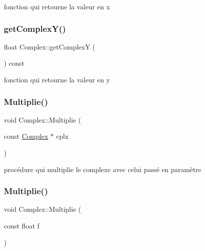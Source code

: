 fonction qui retourne la valeur en x 

\mbox{\label{classComplex_ae94fc4f9008123778a6a6a012ca5059b}} 
\subsubsection{\texorpdfstring{get\+Complex\+Y()}{getComplexY()}}
{\footnotesize\ttfamily float Complex\+::get\+ComplexY (\begin{DoxyParamCaption}{ }\end{DoxyParamCaption}) const}



fonction qui retourne la valeur en y 

\mbox{\label{classComplex_ae2d874e5fd18af604d6b1429b2b252b1}} 
\subsubsection{\texorpdfstring{Multiplie()}{Multiplie()}\hspace{0.1cm}{\footnotesize\ttfamily [1/2]}}
{\footnotesize\ttfamily void Complex\+::\+Multiplie (\begin{DoxyParamCaption}\item[{const \hyperlink{classComplex}{Complex} $\ast$}]{cplx }\end{DoxyParamCaption})}



procédure qui multiplie le complexe avec celui passé en paramètre 

\mbox{\label{classComplex_ac1cf09bfb20040d2b7bd135e40f51929}} 
\subsubsection{\texorpdfstring{Multiplie()}{Multiplie()}\hspace{0.1cm}{\footnotesize\ttfamily [2/2]}}
{\footnotesize\ttfamily void Complex\+::\+Multiplie (\begin{DoxyParamCaption}\item[{const float}]{f }\end{DoxyParamCaption})}



